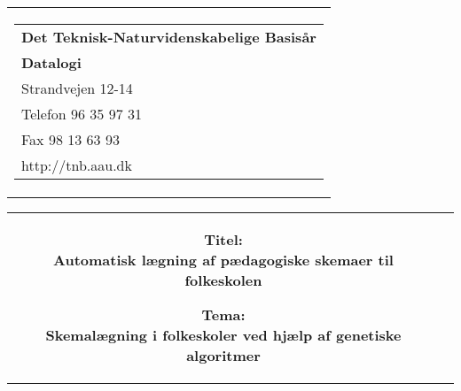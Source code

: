 \begin{titlepage}
	\begin{nopagebreak}
	{\small\samepage 
	\hfill\begin{tabular}{r}
	\parbox{5cm}{  
	\hfill \parbox{5.5cm}{\begin{tabular}{l}
	{\sf\small \textbf{Det Teknisk-Naturvidenskabelige Basis{\aa}r }}\\
	{\sf\small  \textbf{Datalogi}} \\
	{\sf\small Strandvejen 12-14} \\
	{\sf\small Telefon 96 35 97 31} \\
	{\sf\small Fax 98 13 63 93} \\
	{\sf\small http://tnb.aau.dk}
	\end{tabular}}}
	\\
	\end{tabular}

	\begin{tabular}{cc}
	\parbox{7cm}{\vspace{-4cm}
	\begin{description}

	\item {\bf Titel: \\Automatisk lægning af pædagogiske skemaer til folkeskolen} 
	  
	\item {\bf Tema: \\Skemalægning i folkeskoler ved hjælp af genetiske algoritmer} 

	\end{description}

	\parbox{7cm}{

}}
\end{tabular}}
\end{nopagebreak}
\end{titlepage}
